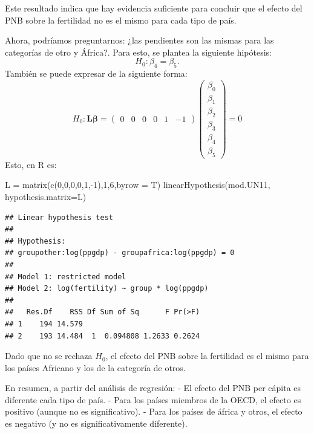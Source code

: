 \documentclass[
]{article}
\newenvironment{Shaded}{\begin{snugshade}}{\end{snugshade}}
\newcommand{\AttributeTok}[1]{\textcolor[rgb]{0.77,0.63,0.00}{#1}}
\newcommand{\DecValTok}[1]{\textcolor[rgb]{0.00,0.00,0.81}{#1}}
\newcommand{\FunctionTok}[1]{\textcolor[rgb]{0.00,0.00,0.00}{#1}}
\newcommand{\NormalTok}[1]{#1}
\newcommand{\OtherTok}[1]{\textcolor[rgb]{0.56,0.35,0.01}{#1}}
\newcommand{\SpecialCharTok}[1]{\textcolor[rgb]{0.00,0.00,0.00}{#1}}
\begin{document}
Este resultado indica que hay evidencia suficiente para concluir que el efecto del PNB sobre la fertilidad no es el mismo para cada tipo de país.

Ahora, podríamos preguntarnos: ¿las pendientes son las mismas para las categorías de otro y África?. Para esto, se plantea la siguiente hipótesis:
\[
H_0: \beta_4 = \beta_5.
\]
También se puede expresar de la siguiente forma:
\[
H_{0}: \boldsymbol L\boldsymbol \beta= \begin{pmatrix}
0 & 0 & 0 & 0 & 1 & -1
\end{pmatrix} \begin{pmatrix}
\beta_0 \\ \beta_1 \\ \beta_2 \\ \beta_3 \\ \beta_4 \\ \beta_5
\end{pmatrix} = 0
\]
Esto, en R es:

\begin{Shaded}
\begin{Highlighting}[]
\NormalTok{L }\OtherTok{=} \FunctionTok{matrix}\NormalTok{(}\FunctionTok{c}\NormalTok{(}\DecValTok{0}\NormalTok{,}\DecValTok{0}\NormalTok{,}\DecValTok{0}\NormalTok{,}\DecValTok{0}\NormalTok{,}\DecValTok{1}\NormalTok{,}\SpecialCharTok{{-}}\DecValTok{1}\NormalTok{),}\DecValTok{1}\NormalTok{,}\DecValTok{6}\NormalTok{,}\AttributeTok{byrow =}\NormalTok{ T)}
\FunctionTok{linearHypothesis}\NormalTok{(mod.UN11, }\AttributeTok{hypothesis.matrix=}\NormalTok{L)}
\end{Highlighting}
\end{Shaded}

\begin{verbatim}
## Linear hypothesis test
## 
## Hypothesis:
## groupother:log(ppgdp) - groupafrica:log(ppgdp) = 0
## 
## Model 1: restricted model
## Model 2: log(fertility) ~ group * log(ppgdp)
## 
##   Res.Df    RSS Df Sum of Sq      F Pr(>F)
## 1    194 14.579                           
## 2    193 14.484  1  0.094808 1.2633 0.2624
\end{verbatim}

Dado que no se rechaza \(H_0\), el efecto del PNB sobre la fertilidad es el mismo para los países Africano y los de la categoría de otros.

En resumen, a partir del análisis de regresión:
- El efecto del PNB per cápita es diferente cada tipo de país.
- Para los países miembros de la OECD, el efecto es positivo (aunque no es significativo).
- Para los países de áfrica y otros, el efecto es negativo (y no es significativamente diferente).
\end{document}
